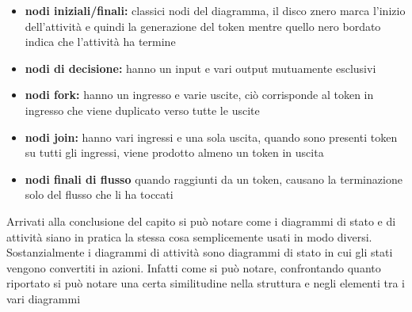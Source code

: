 \documentclass[a4paper, 11pt,oneside]{book}
\newcommand{\spacing}{\par\bigskip\noindent}
\begin{document}
        \begin{itemize}
            \item \textbf{nodi iniziali/finali:} classici nodi del diagramma, il disco znero marca l'inizio dell'attività e quindi la generazione del token mentre quello nero bordato indica che l'attività ha termine
            \item \textbf{nodi di decisione:} hanno un input e vari output mutuamente esclusivi
            \item \textbf{nodi fork:} hanno un ingresso e varie uscite, ciò corrisponde al token in ingresso che viene duplicato verso tutte le uscite
            \item \textbf{nodi join:} hanno vari ingressi e una sola uscita, quando sono presenti token su tutti gli ingressi, viene prodotto almeno un token in uscita
            \item \textbf{nodi finali di flusso} quando raggiunti da un token, causano la terminazione solo del flusso che li ha toccati
        \end{itemize}
        \spacing
        Arrivati alla conclusione del capito si può notare come i diagrammi di stato e di attività siano in pratica la stessa cosa semplicemente usati in modo diversi. Sostanzialmente i diagrammi di attività sono diagrammi di stato in cui gli stati vengono convertiti in azioni.
        Infatti come si può notare, confrontando quanto riportato si può notare una certa similitudine nella struttura e negli elementi tra i vari diagrammi



\end{document}
